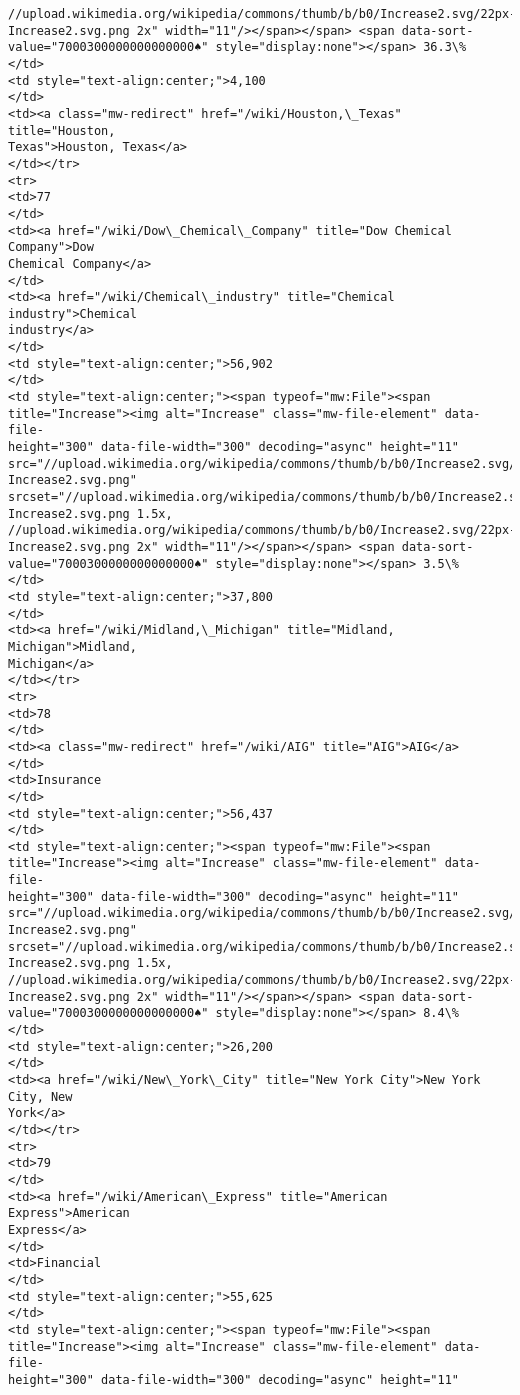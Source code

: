 \documentclass[11pt]{article}
\begin{document}
\begin{Verbatim}[commandchars=\\\{\}]
//upload.wikimedia.org/wikipedia/commons/thumb/b/b0/Increase2.svg/22px-
Increase2.svg.png 2x" width="11"/></span></span> <span data-sort-
value="7000300000000000000♠" style="display:none"></span> 36.3\%
</td>
<td style="text-align:center;">4,100
</td>
<td><a class="mw-redirect" href="/wiki/Houston,\_Texas" title="Houston,
Texas">Houston, Texas</a>
</td></tr>
<tr>
<td>77
</td>
<td><a href="/wiki/Dow\_Chemical\_Company" title="Dow Chemical Company">Dow
Chemical Company</a>
</td>
<td><a href="/wiki/Chemical\_industry" title="Chemical industry">Chemical
industry</a>
</td>
<td style="text-align:center;">56,902
</td>
<td style="text-align:center;"><span typeof="mw:File"><span
title="Increase"><img alt="Increase" class="mw-file-element" data-file-
height="300" data-file-width="300" decoding="async" height="11"
src="//upload.wikimedia.org/wikipedia/commons/thumb/b/b0/Increase2.svg/11px-
Increase2.svg.png"
srcset="//upload.wikimedia.org/wikipedia/commons/thumb/b/b0/Increase2.svg/17px-
Increase2.svg.png 1.5x,
//upload.wikimedia.org/wikipedia/commons/thumb/b/b0/Increase2.svg/22px-
Increase2.svg.png 2x" width="11"/></span></span> <span data-sort-
value="7000300000000000000♠" style="display:none"></span> 3.5\%
</td>
<td style="text-align:center;">37,800
</td>
<td><a href="/wiki/Midland,\_Michigan" title="Midland, Michigan">Midland,
Michigan</a>
</td></tr>
<tr>
<td>78
</td>
<td><a class="mw-redirect" href="/wiki/AIG" title="AIG">AIG</a>
</td>
<td>Insurance
</td>
<td style="text-align:center;">56,437
</td>
<td style="text-align:center;"><span typeof="mw:File"><span
title="Increase"><img alt="Increase" class="mw-file-element" data-file-
height="300" data-file-width="300" decoding="async" height="11"
src="//upload.wikimedia.org/wikipedia/commons/thumb/b/b0/Increase2.svg/11px-
Increase2.svg.png"
srcset="//upload.wikimedia.org/wikipedia/commons/thumb/b/b0/Increase2.svg/17px-
Increase2.svg.png 1.5x,
//upload.wikimedia.org/wikipedia/commons/thumb/b/b0/Increase2.svg/22px-
Increase2.svg.png 2x" width="11"/></span></span> <span data-sort-
value="7000300000000000000♠" style="display:none"></span> 8.4\%
</td>
<td style="text-align:center;">26,200
</td>
<td><a href="/wiki/New\_York\_City" title="New York City">New York City, New
York</a>
</td></tr>
<tr>
<td>79
</td>
<td><a href="/wiki/American\_Express" title="American Express">American
Express</a>
</td>
<td>Financial
</td>
<td style="text-align:center;">55,625
</td>
<td style="text-align:center;"><span typeof="mw:File"><span
title="Increase"><img alt="Increase" class="mw-file-element" data-file-
height="300" data-file-width="300" decoding="async" height="11"

\end{Verbatim}
\end{document}
